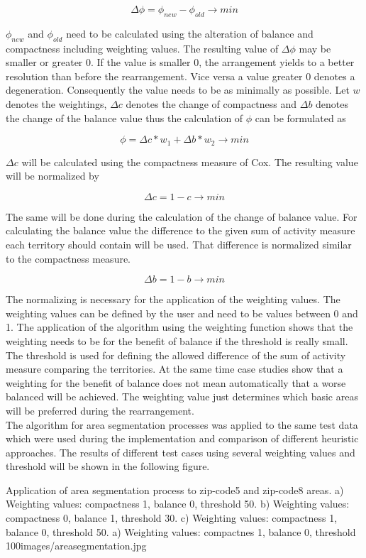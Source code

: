 \[ \mathit{\Delta \phi = \phi_{new}-\phi_{old} \to min}\]

$\phi_{new}$ and $\phi_{old}$ need to be calculated using the alteration of balance and compactness including weighting values. The resulting value of $\Delta \phi$ may be smaller or greater 0. If the value is smaller 0, the arrangement yields to a better resolution than before the rearrangement. Vice versa a value greater 0 denotes a degeneration. Consequently the value needs to be as minimally as possible. 
Let $w$ denotes the weightings, $\Delta c$ denotes the change of compactness and $\Delta b$ denotes the change of the balance value thus the calculation of $\phi$ can be formulated as

\[ \mathit{\phi = \Delta c * w_{1} + \Delta b * w_{2} \to min}\]

$\Delta c$ will be calculated using the compactness measure of Cox. The resulting value will be normalized by 

\[ \mathit{\Delta c = 1 - c \to min}\]

The same will be done during the calculation of the change of balance value. For calculating the balance value the difference to the given sum of activity measure each territory should contain will be used. That difference is normalized similar to the compactness measure.

\[ \mathit{\Delta b = 1 - b \to min}\]

The normalizing is necessary for the application of the weighting values. The weighting values can be defined by the user and need to be values between 0 and 1. The application of the algorithm using the weighting function shows that the weighting needs to be for the benefit of balance if the threshold is really small. The threshold is used for defining the allowed difference of the sum of activity measure comparing the territories. At the same time case studies show that a weighting for the benefit of balance does not mean automatically that a worse balanced will be achieved. The weighting value just determines which basic areas will be preferred during the rearrangement. \\ 
The algorithm for area segmentation processes was applied to the same test data which were used during the implementation and comparison of different heuristic approaches. The results of different test cases using several weighting values and threshold will be shown in the following figure.

\begin{figureOwn}{Application of area segmentation process to zip-code5 and zip-code8 areas. a) Weighting values: compactness 1, balance 0, threshold 50. b) Weighting values: compactness 0, balance 1, threshold 30. c) Weighting values: compactness 1, balance 0, threshold 50. a) Weighting values: compactnes 1, balance 0, threshold 100}{images/areasegmentation.jpg}\end{figureOwn}

